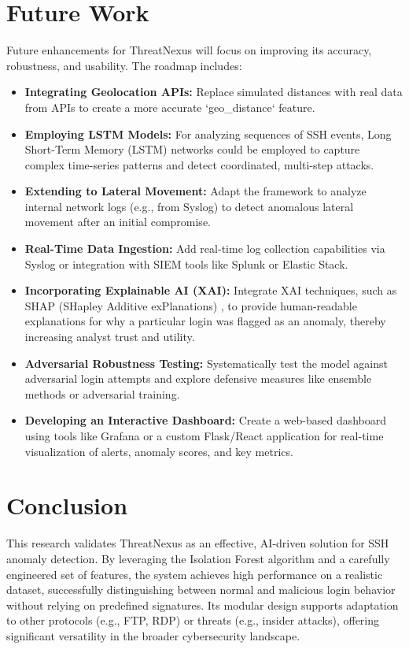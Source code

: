 \documentclass[conference]{IEEEtran}
\begin{document}
\section{Future Work}
Future enhancements for ThreatNexus will focus on improving its accuracy, robustness, and usability. The roadmap includes:
\begin{itemize}
    \item \textbf{Integrating Geolocation APIs:} Replace simulated distances with real data from APIs to create a more accurate `geo_distance` feature.
    \item \textbf{Employing LSTM Models:} For analyzing sequences of SSH events, Long Short-Term Memory (LSTM) networks could be employed to capture complex time-series patterns and detect coordinated, multi-step attacks.
    \item \textbf{Extending to Lateral Movement:} Adapt the framework to analyze internal network logs (e.g., from Syslog) to detect anomalous lateral movement after an initial compromise.
    \item \textbf{Real-Time Data Ingestion:} Add real-time log collection capabilities via Syslog or integration with SIEM tools like Splunk or Elastic Stack.
    \item \textbf{Incorporating Explainable AI (XAI):} Integrate XAI techniques, such as SHAP (SHapley Additive exPlanations) \cite{lundberg2017unified}, to provide human-readable explanations for why a particular login was flagged as an anomaly, thereby increasing analyst trust and utility.
    \item \textbf{Adversarial Robustness Testing:} Systematically test the model against adversarial login attempts and explore defensive measures like ensemble methods or adversarial training.
    \item \textbf{Developing an Interactive Dashboard:} Create a web-based dashboard using tools like Grafana or a custom Flask/React application for real-time visualization of alerts, anomaly scores, and key metrics.
\end{itemize}

\section{Conclusion}
This research validates ThreatNexus as an effective, AI-driven solution for SSH anomaly detection. By leveraging the Isolation Forest algorithm and a carefully engineered set of features, the system achieves high performance on a realistic dataset, successfully distinguishing between normal and malicious login behavior without relying on predefined signatures. Its modular design supports adaptation to other protocols (e.g., FTP, RDP) or threats (e.g., insider attacks), offering significant versatility in the broader cybersecurity landscape.
\end{document}
